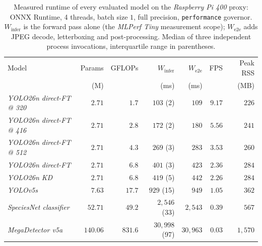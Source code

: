 \begin{table}[htbp]
  \centering
  \caption[Runtime benchmark on the Raspberry Pi 400]{Measured runtime of every evaluated model on the \textit{Raspberry Pi 400} proxy: ONNX Runtime, 4 threads, batch size $1$, full precision, \texttt{performance} governor. $W_{\mathrm{infer}}$ is the forward pass alone (the \textit{MLPerf Tiny} measurement scope); $W_{\mathrm{e2e}}$ adds JPEG decode, letterboxing and post-processing. Median of three independent process invocations, interquartile range in parentheses.}
  \label{tab:embedded-latency}
  \begin{tabular}{lrrrrrr}
    \toprule
    Model & Params & GFLOPs & $W_{\mathrm{infer}}$ & $W_{\mathrm{e2e}}$ & FPS & Peak RSS \\
     & (M) & & (ms) & (ms) & & (MB) \\
    \midrule
    \textit{YOLO26n direct-FT @ 320} & $2.71$ & $1.7$ & $103$ (2) & $109$ & $9.17$ & $226$ \\
    \textit{YOLO26n direct-FT @ 416} & $2.71$ & $2.8$ & $172$ (2) & $180$ & $5.56$ & $241$ \\
    \textit{YOLO26n direct-FT @ 512} & $2.71$ & $4.3$ & $269$ (3) & $283$ & $3.53$ & $260$ \\
    \textit{YOLO26n direct-FT} & $2.71$ & $6.8$ & $401$ (3) & $423$ & $2.36$ & $284$ \\
    \textit{YOLO26n KD} & $2.71$ & $6.8$ & $419$ (5) & $442$ & $2.26$ & $284$ \\
    \textit{YOLOv5s} & $7.63$ & $17.7$ & $929$ (15) & $949$ & $1.05$ & $362$ \\
    \textit{SpeciesNet classifier} & $52.71$ & $49.2$ & $2,546$ (33) & $2,543$ & $0.39$ & $567$ \\
    \textit{MegaDetector v5a} & $140.06$ & $831.6$ & $30,998$ (97) & $30,963$ & $0.03$ & $1,570$ \\
    \bottomrule
  \end{tabular}
\end{table}

